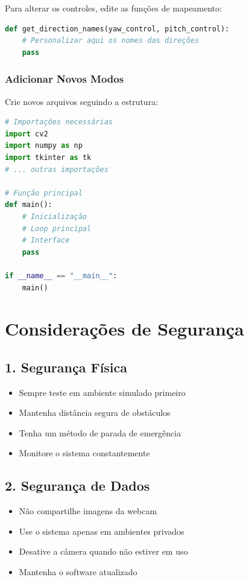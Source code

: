 \documentclass[12pt,a4paper]{article}
\begin{document}
Para alterar os controles, edite as funções de mapeamento:

\begin{lstlisting}[language=python]
def get_direction_names(yaw_control, pitch_control):
    # Personalizar aqui os nomes das direções
    pass
\end{lstlisting}

\subsubsection{Adicionar Novos Modos}

Crie novos arquivos seguindo a estrutura:

\begin{lstlisting}[language=python]
# Importações necessárias
import cv2
import numpy as np
import tkinter as tk
# ... outras importações

# Função principal
def main():
    # Inicialização
    # Loop principal
    # Interface
    pass

if __name__ == "__main__":
    main()
\end{lstlisting}

\section{Considerações de Segurança}

\subsection{1. Segurança Física}

\begin{itemize}
    \item Sempre teste em ambiente simulado primeiro
    \item Mantenha distância segura de obstáculos
    \item Tenha um método de parada de emergência
    \item Monitore o sistema constantemente
\end{itemize}

\subsection{2. Segurança de Dados}

\begin{itemize}
    \item Não compartilhe imagens da webcam
    \item Use o sistema apenas em ambientes privados
    \item Desative a câmera quando não estiver em uso
    \item Mantenha o software atualizado
\end{itemize}
\end{document}
